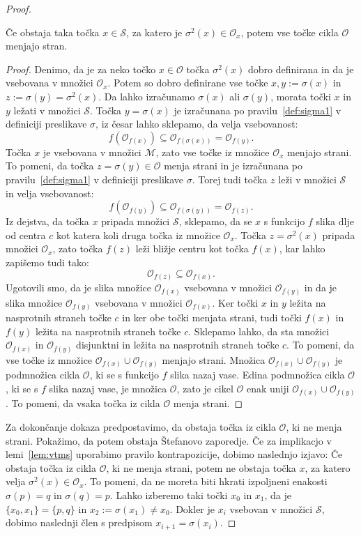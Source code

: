 \documentclass[../TG_magistrsko_delo_sections.tex]{subfiles}
\begin{document}
\begin{proof}
\begin{lema}\label{lem:vtms}
Če obstaja taka točka $x \in \mathcal{S}$, za katero je $\sigma^2(x) \in \mathcal{O}_x$, potem vse točke cikla $\mathcal{O}$ menjajo stran.
\end{lema}
\begin{proof}
Denimo, da je za neko točko $x \in \mathcal{O}$ točka $\sigma^2(x)$ dobro definirana in da je vsebovana v množici $\mathcal{O}_x$. Potem so dobro definirane vse točke $x, y:=\sigma(x)$ in $z:=\sigma(y) = \sigma^2(x)$. Da lahko izračunamo $\sigma(x)$ ali $\sigma(y)$, morata točki $x$ in $y$ ležati v množici $\mathcal{S}$. Točka $y=\sigma(x)$ je izračunana po pravilu~\ref{def:sigma1} v definiciji preslikave $\sigma$, iz česar lahko sklepamo, da velja vsebovanost:
$$f(\mathcal{O}_{f(x)}) \subseteq \mathcal{O}_{f(\sigma(x))}=\mathcal{O}_{f(y)}.$$
Točka $x$ je vsebovana v množici $\mathcal{M}$, zato vse točke iz množice $\mathcal{O}_x$ menjajo strani. To pomeni, da točka $z = \sigma(y) \in \mathcal{O}$ menja strani in je izračunana po pravilu~\ref{def:sigma1} v definiciji preslikave $\sigma$. Torej tudi točka $z$ leži v množici $\mathcal{S}$ in velja vsebovanost:
$$f(\mathcal{O}_{f(y)}) \subseteq \mathcal{O}_{f(\sigma(y))}=\mathcal{O}_{f(z)}.$$
Iz dejstva, da točka $x$ pripada množici $\mathcal{S}$, sklepamo, da se $x$ s funkcijo $f$ slika dlje od centra $c$ kot katera koli druga točka iz množice $\mathcal{O}_x$. Točka $z=\sigma^2(x)$ pripada množici $\mathcal{O}_x$, zato točka $f(z)$ leži bližje centru kot točka $f(x)$, kar lahko zapišemo tudi tako:
$$\mathcal{O}_{f(z)} \subseteq \mathcal{O}_{f(x)}.$$
Ugotovili smo, da je slika množice $\mathcal{O}_{f(x)}$ vsebovana v množici $\mathcal{O}_{f(y)}$ in da je slika množice $\mathcal{O}_{f(y)}$ vsebovana v množici $\mathcal{O}_{f(x)}$. Ker točki $x$ in $y$ ležita na nasprotnih straneh točke $c$ in ker obe točki menjata strani, tudi točki $f(x)$ in $f(y)$ ležita na nasprotnih straneh točke $c$. Sklepamo lahko, da sta množici $\mathcal{O}_{f(x)}$ in $\mathcal{O}_{f(y)}$ disjunktni in ležita na nasprotnih straneh točke $c$. To pomeni, da vse točke iz množice $\mathcal{O}_{f(x)} \cup \mathcal{O}_{f(y)}$ menjajo strani. Množica $\mathcal{O}_{f(x)} \cup \mathcal{O}_{f(y)}$ je podmnožica cikla $\mathcal{O}$, ki se s funkcijo $f$ slika nazaj vase. Edina podmnožica cikla $\mathcal{O}$, ki se s $f$ slika nazaj vase, je množica $\mathcal{O}$, zato je cikel $\mathcal{O}$ enak uniji $\mathcal{O}_{f(x)} \cup \mathcal{O}_{f(y)}$. To pomeni, da vsaka točka iz cikla $\mathcal{O}$ menja strani. 
\end{proof}
Za dokončanje dokaza predpostavimo, da obstaja točka iz cikla $\mathcal{O}$, ki ne menja strani. Pokažimo, da potem obstaja Štefanovo zaporedje.
Če za implikacjo v lemi~\ref{lem:vtms} uporabimo pravilo kontrapozicije, dobimo naslednjo izjavo: Če obstaja točka iz cikla $\mathcal{O}$, ki ne menja strani, potem ne obstaja točka $x$, za katero velja $\sigma^2(x) \in \mathcal{O}_x$. To pomeni, da ne moreta biti hkrati izpoljneni enakosti $\sigma(p) = q$ in $\sigma(q) = p$. Lahko izberemo taki točki $x_0$ in $x_1$, da je $\{x_0, x_1\} = \{p, q\}$ in $x_2 := \sigma(x_1) \neq x_0$. Dokler je $x_i$ vsebovan v množici $\mathcal{S}$, dobimo naslednji člen s predpisom $x_{i+1} = \sigma(x_i)$.


\end{proof}
\end{document}

